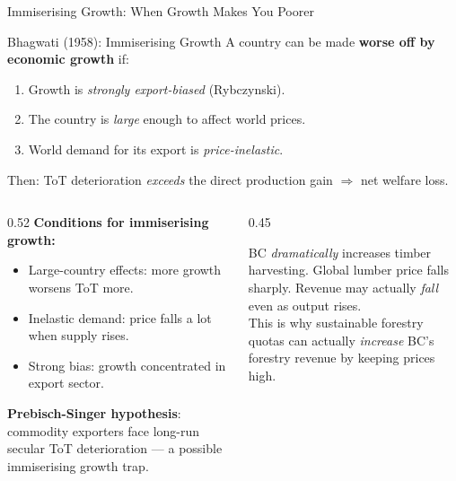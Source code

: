 \documentclass[aspectratio=169]{beamer}
\begin{document}
\begin{frame}{Immiserising Growth: When Growth Makes You Poorer}
\begin{block}{Bhagwati (1958): Immiserising Growth}
A country can be made \textbf{worse off by economic growth} if:
\begin{enumerate}
  \item Growth is \emph{strongly export-biased} (Rybczynski).
  \item The country is \emph{large} enough to affect world prices.
  \item World demand for its export is \emph{price-inelastic}.
\end{enumerate}
Then: ToT deterioration \emph{exceeds} the direct production gain $\Rightarrow$ net welfare loss.
\end{block}
\vspace{0.3em}
\begin{columns}
\begin{column}{0.52\textwidth}
\textbf{Conditions for immiserising growth:}
\begin{itemize}
  \item Large-country effects: more growth worsens ToT more.
  \item Inelastic demand: price falls a lot when supply rises.
  \item Strong bias: growth concentrated in export sector.
\end{itemize}
\textbf{Prebisch-Singer hypothesis}: commodity exporters face long-run secular ToT deterioration --- a possible immiserising growth trap.
\end{column}
\begin{column}{0.45\textwidth}
\begin{canadex}
  BC \emph{dramatically} increases timber harvesting. Global lumber price falls sharply. Revenue may actually \emph{fall} even as output rises.\\[0.3em]
  This is why sustainable forestry quotas can actually \emph{increase} BC's forestry revenue by keeping prices high.
\end{canadex}
\end{column}
\end{columns}
\end{frame}
\end{document}
